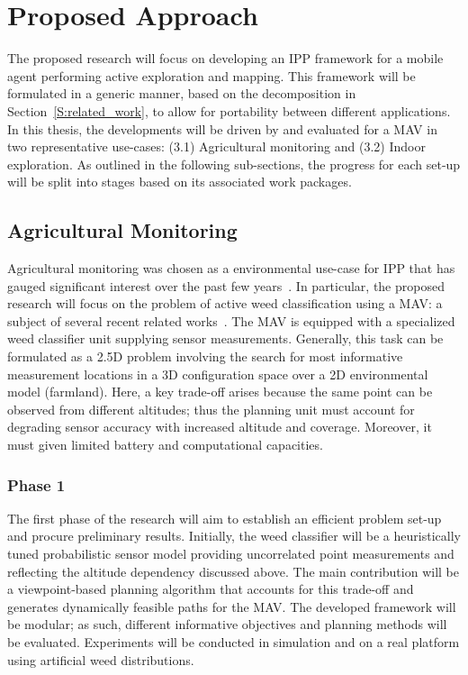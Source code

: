 \section{Proposed Approach}
\label{S:proposed_approach}

The proposed research will focus on developing an IPP framework for a mobile agent 
performing active exploration and mapping. This framework will be formulated in a 
generic manner, based on the decomposition in Section~\ref{S:related_work}, to allow for portability between 
different applications. In this thesis, the developments will be driven by and evaluated for a MAV in two 
representative use-cases: (3.1) Agricultural monitoring and (3.2) Indoor exploration.  As outlined in the 
following sub-sections, the progress for each set-up will be split into stages based on its associated work 
packages.

\subsection{Agricultural Monitoring}

Agricultural monitoring was chosen as a environmental use-case for IPP that 
has gauged significant interest over the past few years~\cite{Detweiler2015, Cardina1997, Anthony2014}. 
In particular, the proposed research will focus on the problem of active weed classification using a 
MAV: a subject of several recent related works~\cite{Vivaldini2016, Sadat2015}. The MAV is 
equipped with a specialized weed classifier unit supplying sensor measurements. Generally, this task can be 
formulated as a 2.5D problem involving the 
search for most informative measurement locations in a 3D configuration space over a 2D environmental model 
(farmland). Here, a key trade-off arises because the same point can be observed from different altitudes; thus 
the planning unit must account for degrading sensor accuracy with increased altitude and coverage. Moreover, 
it must given limited battery and computational capacities.

\subsubsection{Phase 1}

The first phase of the research will aim to establish an efficient problem set-up and procure 
preliminary results. Initially, the weed classifier will be a heuristically tuned probabilistic sensor model 
providing uncorrelated point measurements and reflecting the altitude dependency discussed above. The main 
contribution will be a viewpoint-based planning algorithm that accounts for this trade-off and generates 
dynamically feasible paths for the MAV. The developed framework will be modular; as such, different 
informative objectives and planning methods will be evaluated. Experiments will be conducted in simulation and 
on a real platform using artificial weed distributions.


